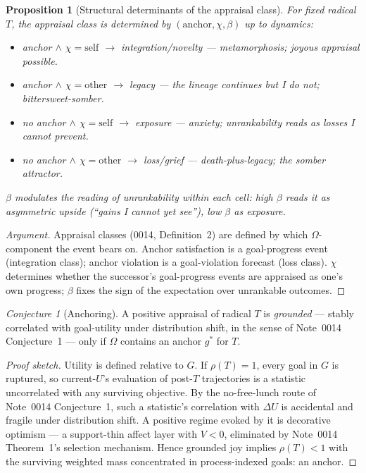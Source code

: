 \documentclass[11pt]{article}
\newtheorem{proposition}{Proposition}
\theoremstyle{definition}
\theoremstyle{remark}
\newtheorem{conjecture}{Conjecture}
\begin{document}
\begin{proposition}[Structural determinants of the appraisal class]
For fixed radical $T$, the appraisal class is determined by $(\text{anchor},
\chi, \beta)$ up to dynamics:
\begin{itemize}[leftmargin=2em]
\item anchor $\wedge$ $\chi{=}\mathrm{self}$ $\to$ integration/novelty ---
  \emph{metamorphosis}; joyous appraisal possible.
\item anchor $\wedge$ $\chi{=}\mathrm{other}$ $\to$ \emph{legacy} --- the
  lineage continues but I do not; bittersweet-somber.
\item no anchor $\wedge$ $\chi{=}\mathrm{self}$ $\to$ \emph{exposure} ---
  anxiety; unrankability reads as losses I cannot prevent.
\item no anchor $\wedge$ $\chi{=}\mathrm{other}$ $\to$ \emph{loss/grief} ---
  death-plus-legacy; the somber attractor.
\end{itemize}
$\beta$ modulates the reading of unrankability within each cell: high $\beta$
reads it as asymmetric upside (``gains I cannot yet see''), low $\beta$ as
exposure.
\end{proposition}

\begin{proof}[Argument]
Appraisal classes (0014, Definition~2) are defined by which
$\Omega$-component the event bears on. Anchor satisfaction is a goal-progress
event (integration class); anchor violation is a goal-violation forecast
(loss class). $\chi$ determines whether the successor's goal-progress events
are appraised as one's own progress; $\beta$ fixes the sign of the
expectation over unrankable outcomes.
\end{proof}

\begin{conjecture}[Anchoring]\label{conj:anchoring}
A positive appraisal of radical $T$ is \emph{grounded} --- stably correlated
with goal-utility under distribution shift, in the sense of Note~0014
Conjecture~1 --- only if $\Omega$ contains an anchor $g^*$ for $T$.
\end{conjecture}

\begin{proof}[Proof sketch]
Utility is defined relative to $G$. If $\rho(T) = 1$, every goal in $G$ is
ruptured, so current-$U$'s evaluation of post-$T$ trajectories is a statistic
uncorrelated with any surviving objective. By the no-free-lunch route of
Note~0014 Conjecture~1, such a statistic's correlation with $\Delta U$ is
accidental and fragile under distribution shift. A positive regime evoked by
it is decorative optimism --- a support-thin affect layer with $V < 0$,
eliminated by Note~0014 Theorem~1's selection mechanism. Hence grounded joy
implies $\rho(T) < 1$ with the surviving weighted mass concentrated in
process-indexed goals: an anchor.
\end{proof}
\end{document}
